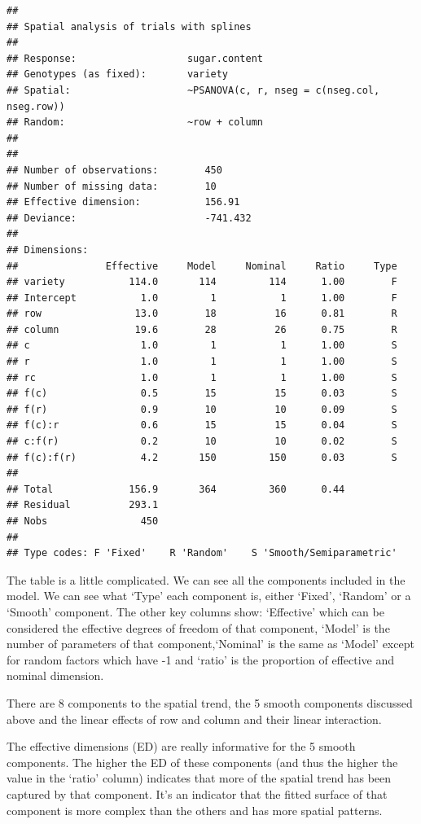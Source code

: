 \documentclass[
]{book}
\begin{document}
\begin{verbatim}
## 
## Spatial analysis of trials with splines 
## 
## Response:                   sugar.content
## Genotypes (as fixed):       variety   
## Spatial:                    ~PSANOVA(c, r, nseg = c(nseg.col, nseg.row))
## Random:                     ~row + column
## 
## 
## Number of observations:        450
## Number of missing data:        10
## Effective dimension:           156.91
## Deviance:                      -741.432
## 
## Dimensions:
##               Effective     Model     Nominal     Ratio     Type
## variety           114.0       114         114      1.00        F
## Intercept           1.0         1           1      1.00        F
## row                13.0        18          16      0.81        R
## column             19.6        28          26      0.75        R
## c                   1.0         1           1      1.00        S
## r                   1.0         1           1      1.00        S
## rc                  1.0         1           1      1.00        S
## f(c)                0.5        15          15      0.03        S
## f(r)                0.9        10          10      0.09        S
## f(c):r              0.6        15          15      0.04        S
## c:f(r)              0.2        10          10      0.02        S
## f(c):f(r)           4.2       150         150      0.03        S
##                                                                 
## Total             156.9       364         360      0.44         
## Residual          293.1                                         
## Nobs                450                                         
## 
## Type codes: F 'Fixed'    R 'Random'    S 'Smooth/Semiparametric'
\end{verbatim}

The table is a little complicated. We can see all the components included in the model. We can see what `Type' each component is, either `Fixed', `Random' or a `Smooth' component. The other key columns show: `Effective' which can be considered the effective degrees of freedom of that component, `Model' is the number of parameters of that component,`Nominal' is the same as `Model' except for random factors which have -1 and `ratio' is the proportion of effective and nominal dimension.

There are 8 components to the spatial trend, the 5 smooth components discussed above and the linear effects of row and column and their linear interaction.

The effective dimensions (ED) are really informative for the 5 smooth components. The higher the ED of these components (and thus the higher the value in the `ratio' column) indicates that more of the spatial trend has been captured by that component. It's an indicator that the fitted surface of that component is more complex than the others and has more spatial patterns.
\end{document}
